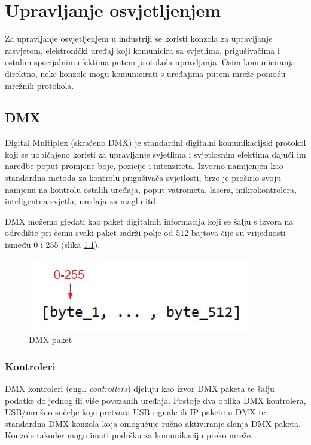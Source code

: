 \documentclass[times, utf8, zavrsni, numeric]{fer}
\begin{document}
\chapter{Upravljanje osvjetljenjem}
Za upravljanje osvjetljenjem u industriji se koristi konzola za upravljanje rasvjetom, elektronički uređaj koji komunicira sa svjetlima, prigušivačima i ostalim specijalnim efektima putem protokola upravljanja. Osim komuniciranja direktno, neke konzole mogu komunicirati s uređajima putem mreže pomoću mrežnih protokola.

\section{DMX}
Digital Multiplex (skraćeno DMX) je standardni digitalni komunikacijski protokol koji se uobičajeno koristi za upravljanje svjetlima i svjetlosnim efektima dajući im naredbe poput promjene boje, pozicije i intenziteta. Izvorno namijenjen kao standardna metoda za kontrolu prigušivača svjetlosti, brzo je proširio svoju namjenu na kontrolu ostalih uređaja, poput vatrometa, lasera, mikrokontrolera, inteligentna svjetla, uređaja za maglu itd. \newline

DMX možemo gledati kao paket digitalnih informacija koji se šalju s izvora na odredište pri čemu svaki paket sadrži polje od 512 bajtova čije su vrijednosti između 0 i 255 (slika \ref{fig:slika 3-1}).

\begin{figure}[htp]
	\centering
	\includegraphics[width=\linewidth]{slika 3-1.png}
	\caption{DMX paket \cite{dmx_overview}}
	\label{fig:slika 3-1}
\end{figure}

\subsection{Kontroleri}
DMX kontroleri (engl. \emph{controllers}) djeluju kao izvor DMX paketa te šalju podatke do jednog ili više povezanih uređaja. Postoje dva oblika DMX kontrolera, USB/mrežno sučelje koje pretvara USB signale ili IP pakete u DMX te standardna DMX konzola koja omogućuje ručno aktiviranje slanja DMX paketa. Konzole također mogu imati podršku za komunikaciju preko mreže.
\end{document}
